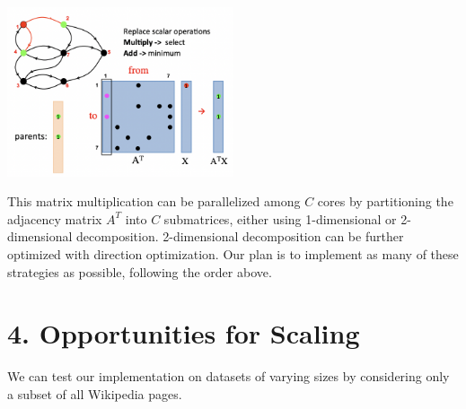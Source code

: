 \documentclass[12pt]{article}
\begin{document}
\begin{center}
\includegraphics[width=0.5\textwidth]{matrix.png}
\end{center}

\noindent This matrix multiplication can be parallelized among $C$ cores by partitioning the adjacency matrix $A^T$ into $C$ submatrices, either using 1-dimensional or 2-dimensional decomposition. 2-dimensional decomposition can be further optimized with direction optimization. Our plan is to implement as many of these strategies as possible, following the order above.

\section*{4. Opportunities for Scaling}

We can test our implementation on datasets of varying sizes by considering only a subset of all Wikipedia pages.
\end{document}
